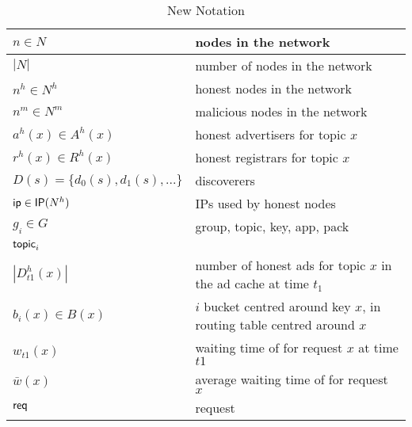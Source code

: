 \begin{table*}
  \caption{New Notation}
  \label{tab:new_notation}
\begin{center}
  \begin{tabular}{ | l | p{16cm} |}
    \hline
      $n \in N$ & nodes in the network \\ \hline
      $|N|$ & number of nodes in the network \\ \hline
      $n^h \in N^h$ & honest nodes in the network \\ \hline
      $n^m \in N^m$ & malicious nodes in the network \\ \hline
      $a^h(x) \in A^h(x)$ & honest advertisers for topic $x$ \\ \hline
      $r^h(x) \in R^h(x)$ & honest registrars for topic $x$ \\ \hline
      $D(s) = \{d_0(s), d_1(s),...\}$ &  discoverers \\ \hline
      $\mathsf{ip} \in \mathsf{IP}(N^h)$ & IPs used by honest nodes \\ \hline
      $g_i \in G$  & group, topic, key, app, pack\\ \hline
      $\mathsf{topic}_i$\\ \hline
      $|D_{t1}^h(x)|$& number of honest ads for topic $x$ in the ad cache at time $t_1$ \\ \hline
      $b_i(x) \in B(x)$& $i$ bucket centred around key $x$, in routing table centred around $x$ \\ \hline
      $w_{t1}(x) $ & waiting time of for request $x$ at time $t1$ \\ \hline
      $\bar{w}(x) $ & average waiting time of for request $x$\\ \hline
      $\mathsf{req}$& request \\ \hline


\end{tabular}
\end{center}
\end{table*}
